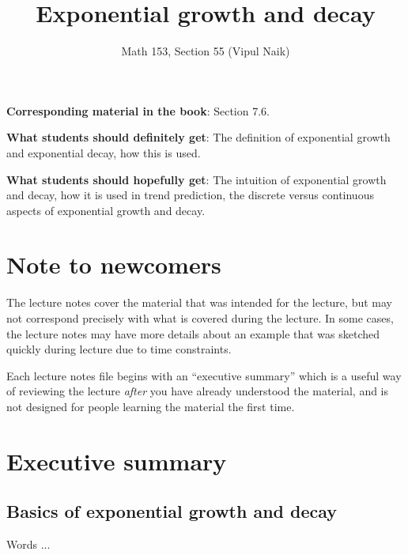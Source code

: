 \documentclass{amsart}
\title{Exponential growth and decay}
\author{Math 153, Section 55 (Vipul Naik)}
\begin{document}
\maketitle

{\bf Corresponding material in the book}: Section 7.6.

{\bf What students should definitely get}: The definition of
exponential growth and exponential decay, how this is used.

{\bf What students should hopefully get}: The intuition of exponential
growth and decay, how it is used in trend prediction, the discrete
versus continuous aspects of exponential growth and decay.

\section*{Note to newcomers}

The lecture notes cover the material that was intended for the
lecture, but may not correspond precisely with what is covered during
the lecture. In some cases, the lecture notes may have more details
about an example that was sketched quickly during lecture due to time
constraints.

Each lecture notes file begins with an ``executive summary'' which is
a useful way of reviewing the lecture {\em after} you have already
understood the material, and is not designed for people learning the
material the first time.

\section*{Executive summary}

\subsection{Basics of exponential growth and decay}

Words ...
\end{document}
